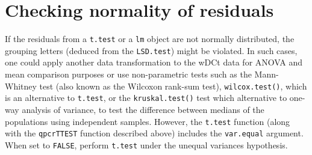 \documentclass[
]{article}
\newenvironment{Shaded}{\begin{snugshade}}{\end{snugshade}}
\newcommand{\AttributeTok}[1]{\textcolor[rgb]{0.13,0.29,0.53}{#1}}
\newcommand{\DecValTok}[1]{\textcolor[rgb]{0.00,0.00,0.81}{#1}}
\newcommand{\FloatTok}[1]{\textcolor[rgb]{0.00,0.00,0.81}{#1}}
\newcommand{\FunctionTok}[1]{\textcolor[rgb]{0.13,0.29,0.53}{\textbf{#1}}}
\newcommand{\NormalTok}[1]{#1}
\newcommand{\SpecialCharTok}[1]{\textcolor[rgb]{0.81,0.36,0.00}{\textbf{#1}}}
\newcommand{\StringTok}[1]{\textcolor[rgb]{0.31,0.60,0.02}{#1}}
\begin{document}
\begin{Shaded}
\end{Shaded}

\hypertarget{checking-normality-of-residuals}{%
\section{Checking normality of
residuals}\label{checking-normality-of-residuals}}

If the residuals from a \texttt{t.test} or a \texttt{lm} object are not
normally distributed, the grouping letters (deduced from the
\texttt{LSD.test}) might be violated. In such cases, one could apply
another data transformation to the wDCt data for ANOVA and mean
comparison purposes or use non-parametric tests such as the Mann-Whitney
test (also known as the Wilcoxon rank-sum test), \texttt{wilcox.test()},
which is an alternative to \texttt{t.test}, or the
\texttt{kruskal.test()} test which alternative to one-way analysis of
variance, to test the difference between medians of the populations
using independent samples. However, the \texttt{t.test} function (along
with the \texttt{qpcrTTEST} function described above) includes the
\texttt{var.equal} argument. When set to \texttt{FALSE}, perform
\texttt{t.test} under the unequal variances hypothesis.
\end{document}
